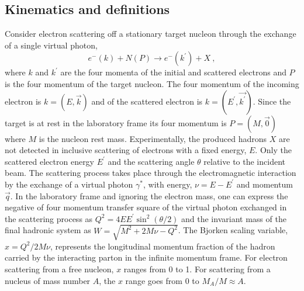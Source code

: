 \subsection{Kinematics and definitions} \label{kinem.ssec}

Consider electron scattering off a stationary target nucleon through the
exchange of a single virtual photon,
%
\begin{equation}
e^{-}(k) + N(P) \longrightarrow e^{-}(k^{'}) + X ~,
\end{equation}
%
where $k$ and $k^{'}$ are the four momenta of the initial and scattered
electrons and $P$ is the four momentum of the target nucleon. The four
momentum of the incoming electron is $k= ( E, \overrightarrow k ) $ and of the
scattered electron is $k= ( E^{'}, \overrightarrow {k ^{'}}) $. Since the target
is at rest in the laboratory frame its four momentum is $P = ( M,
\overrightarrow 0 ) $ where $M$ is the nucleon rest mass. Experimentally, the
produced hadrons $X$ are not detected in inclusive scattering of electrons
with a fixed energy, $E$. Only the scattered electron energy $E^{'}$ and the
scattering angle $\theta$ relative to the incident beam. The scattering
process takes place through the electromagnetic interaction by the exchange of
a virtual photon $\gamma^{*}$, with energy, $\nu=E - E^{'}$ and momentum
$\overrightarrow q$. In the laboratory frame and ignoring the electron mass,
one can express the negative of four momentum transfer square of the
virtual photon exchanged in the scattering process as
$Q^2=4EE^{'}\sin^2\left( \theta/2\right) $ and the invariant mass of the
final hadronic system as $W=\sqrt{M^2+2M\nu - Q^2}$. The Bjorken scaling
variable, $x=Q^2/2M\nu$, represents the longitudinal momentum fraction of the
hadron carried by the interacting parton in the infinite momentum frame. For
electron scattering from a free nucleon, $x$ ranges from 0 to 1. For scattering
from a nucleus of mass number $A$, the $x$ range goes from 0 to
$M_A/M \approx A$.

